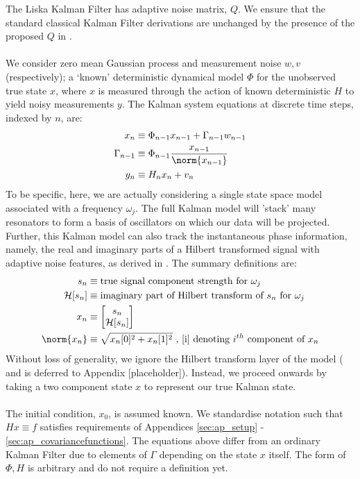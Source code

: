 The Liska Kalman Filter has adaptive noise matrix, $Q$. We ensure that the standard classical  Kalman Filter derivations are unchanged by the presence of the proposed $Q$ in \cite{liska}.
\\
\\
We consider zero mean Gaussian process and measurement noise $w,v$ (respectively); a `known' deterministic dynamical model $\Phi$ for the unobserved true state $x$, where $x$ is measured through the action of known deterministic $H$ to yield noisy measurements $y$. The Kalman system equations at discrete time steps, indexed by $n$, are:
\begin{align}
x_n &\equiv \Phi_{n-1}x_{n-1} + \Gamma_{n-1}w_{n-1} \label{eqn:KF_statemodel}\\
\Gamma_{n-1} &\equiv \Phi_{n-1}\frac{x_{n-1}}{\norm{x_{n-1}}} \\
y_n &\equiv H_n x_n + v_n \label{eqn:KF_msmtmodel}
\end{align}
To be specific, here, we are actually considering a single state space model associated with a frequency $\omega_j$. The full Kalman model will 'stack' many resonators to form a basis of oscillators on which our data will be projected. Further, this Kalman model can also track the instantaneous phase information, namely, the real and imaginary parts of a Hilbert transformed signal with adaptive noise features, as derived in \cite{liska}. The summary definitions are:
\begin{align}
s_n & \equiv \text{true signal component strength for $\omega_j$} \\
\mathcal{H}[s_n] & \equiv \text{imaginary part of Hilbert transform of $s_n$ for $\omega_j$} \\
x_n &\equiv \begin{bmatrix} s_n \\ \mathcal{H}[s_n] \end{bmatrix} \\
\norm{x_n}&\equiv \sqrt{x_{n}[0]^2 + x_{n}[1]^2} \text{ , [i] denoting $i^{th}$ component of $x_n$}
\end{align}
Without loss of generality, we ignore the Hilbert transform layer of the model ( and is deferred to Appendix [placeholder]). Instead, we proceed onwards by taking a two component state $x$ to represent our true Kalman state. 
\\
\\
The initial condition, $x_0$, is assumed known. We standardise notation such that $Hx \equiv f$ satisfies requirements of Appendices \ref{sec:ap_setup} - \ref{sec:ap_covariancefunctions}. The equations above differ from an ordinary Kalman Filter due to elements of $\Gamma$ depending on the state $x$ itself. The form of $\Phi, H$ is arbitrary and do not require a definition yet.
